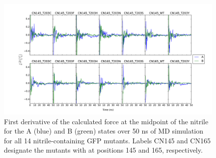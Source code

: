 \begin{figure}
    \center
    \includegraphics[width=\double]{figures-gfp-pKa/force_APBS_firstDerivative.pdf}
    \caption[Convergence of force calculations]{
        First derivative of the calculated force at the midpoint of the nitrile for the A (blue) and B (green) states over 50 ns of MD simulation for all 14 nitrile-containing GFP mutants. 
        Labels CN145 and CN165 designate the mutants with \pCNF{} at positions 145 and 165, respectively.
    }
    \label{fig:force_1stD}
\end{figure}

